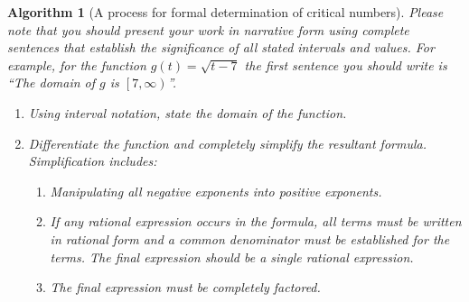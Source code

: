 \documentclass[10pt,oneside,]{book}
\theoremstyle{plain}
\newtheorem{algorithm}[theorem]{Algorithm}
\theoremstyle{definition}
\numberwithin{equation}{section}
\newcommand{\fe}[2]{#1\mathopen{}\left(#2\right)\mathclose{}}
\newcommand{\cointerval}[2]{\left[\left.#1,#2\right)\right.}
\begin{document}
\begin{algorithm}[A process for formal determination of critical numbers]\label{algorithm-find-critical-numbers}
Please note that you should present your work in narrative form using complete sentences that establish the significance of all stated intervals and values.  For example, for the function \(\fe{g}{t}=\sqrt{t-7}\) the first sentence you should write is ``The domain of \(g\) is \(\cointerval{7}{\infty}\)''.%
\begin{enumerate}
\item{}Using interval notation, state the domain of the function.\item{}Differentiate the function and completely simplify the resultant formula.  Simplification includes:
                    \begin{enumerate}
\item{}Manipulating all negative exponents into positive exponents.\item{}If any rational expression occurs in the formula, all terms must be written in rational form and a common denominator must be established for the terms.  The final expression should be a single rational expression.\item{}The final expression must be completely factored.\end{enumerate}


\end{enumerate}
\end{algorithm}
\end{document}
